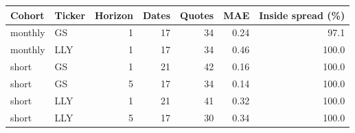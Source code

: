 \begin{tabular}{llrrrrr}
\toprule
Cohort & Ticker & Horizon & Dates & Quotes & MAE & Inside spread (\%) \\
\midrule
monthly & GS & 1 & 17 & 34 & 0.24 & 97.1 \\
monthly & LLY & 1 & 17 & 34 & 0.46 & 100.0 \\
short & GS & 1 & 21 & 42 & 0.16 & 100.0 \\
short & GS & 5 & 17 & 34 & 0.14 & 100.0 \\
short & LLY & 1 & 21 & 41 & 0.32 & 100.0 \\
short & LLY & 5 & 17 & 30 & 0.34 & 100.0 \\
\bottomrule\end{tabular}

